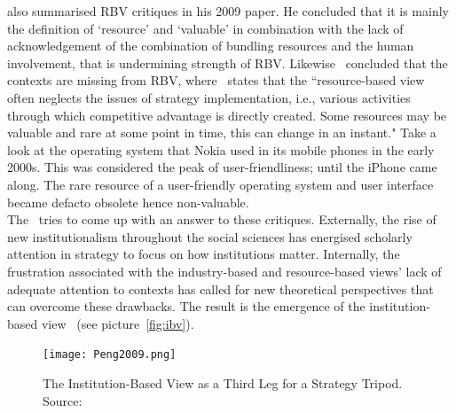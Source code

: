 \cite{Kraaijenbrink:2009} also summarised \gls{RBV} critiques in his 2009 paper. 
He concluded that it is mainly the definition of `resource' and `valuable' in combination with the lack of acknowledgement of the combination of bundling resources and the human involvement, that is undermining strength of \gls{RBV}.
Likewise~\cite{Priem:2001} concluded that the contexts are missing from \gls{RBV}, where~\cite{Dung:2012} states that the ``resource-based view often neglects the issues of strategy implementation, i.e., various activities through which competitive advantage is directly created. Some resources may be valuable and rare at some point in time, this can change in an instant." 
Take a look at the operating system that Nokia used in its mobile phones in the early 2000s. 
This was considered the peak of user-friendliness; until the iPhone came along. 
The rare resource of a user-friendly operating system and user interface became defacto obsolete hence non-valuable.\\

The \ibv~tries to come up with an answer to these critiques. 
Externally, the rise of new institutionalism throughout the social sciences has energised scholarly attention in strategy to focus on how institutions matter. Internally, the frustration associated with the industry-based and resource-based views’ lack of adequate attention to contexts has called for new theoretical perspectives that can overcome these drawbacks. 
The result is the emergence of the institution-based view~\cite{Peng:2009} (see picture~\ref{fig:ibv}).


\begin{figure}[htbp!] 
      \label{fig:ibv2}
	\centering
	\texttt{[image: Peng2009.png]}
 	\caption{The Institution-Based View as a Third Leg for a Strategy Tripod. Source:~\cite{Peng:2009}}
\end{figure}

